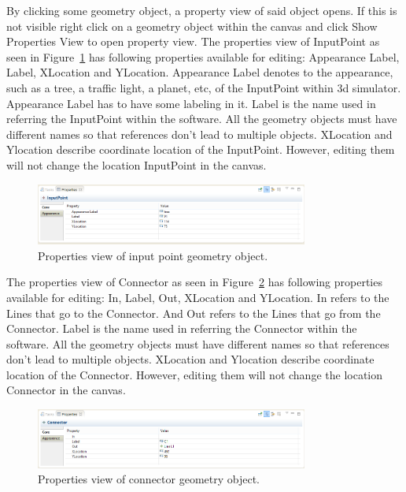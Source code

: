 By clicking some geometry object, a property view of said object opens. If this is not visible right click on a geometry object within the canvas and click Show Properties View to open property view.
The properties view of InputPoint as seen in Figure~\ref{fig:ge-prop-input} has following properties available for editing: Appearance Label, Label, XLocation and YLocation. Appearance Label denotes to the appearance, such as a tree, a traffic light, a planet, etc, of the InputPoint within 3d simulator. Appearance Label has to have some labeling in it. Label is the name used in referring the InputPoint within the software. All the geometry objects must have different names so that references don't lead to multiple objects. XLocation and Ylocation describe coordinate location of the InputPoint. However, editing them will not change the location InputPoint in the canvas.

\begin{figure}[htp]
\begin{center}
  \includegraphics[width=0.8\textwidth]{image/ge-prop-input.png}
  \caption{Properties view of input point geometry object.}
  \label{fig:ge-prop-input}
\end{center}
\end{figure}

The properties view of Connector as seen in Figure~\ref{fig:ge-prop-conn} has following properties available for editing: In, Label, Out, XLocation and YLocation. In refers to the Lines that go to the Connector. And Out refers to the Lines that go from the Connector. Label is the name used in referring the Connector within the software. All the geometry objects must have different names so that references don't lead to multiple objects. XLocation and Ylocation describe coordinate location of the Connector. However, editing them will not change the location Connector in the canvas.

\begin{figure}[htp]
\begin{center}
  \includegraphics[width=0.8\textwidth]{image/ge-prop-conn.png}
  \caption{Properties view of connector geometry object.}
  \label{fig:ge-prop-conn}
\end{center}
\end{figure}

